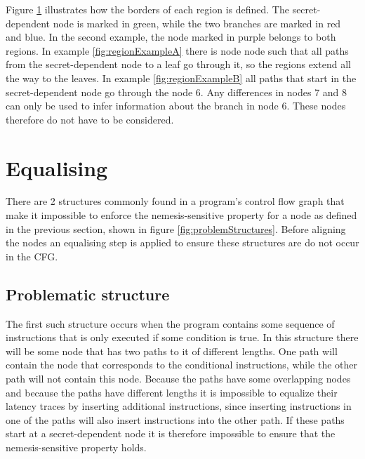 Figure \ref{fig:regionExamples} illustrates how the borders of each region is defined. The secret-dependent node is marked in green, while the two branches are marked in red and blue. In the second example, the node marked in purple belongs to both regions. In example \ref{fig:regionExampleA} there is node node such that all paths from the secret-dependent node to a leaf go through it, so the regions extend all the way to the leaves. In example \ref{fig:regionExampleB} all paths that start in the secret-dependent node go through the node 6. Any differences in nodes 7 and 8 can only be used to infer information about the branch in node 6. These nodes therefore do not have to be considered.  


\begin{figure}
 \centering

 \label{fig:regionExamples}
\end{figure}

\section{Equalising}\label{seq:equalising}
There are 2 structures commonly found in a program's control flow graph that make it impossible to enforce the nemesis-sensitive property for a node as defined in the previous section, 
shown in figure \ref{fig:problemStructures}.  Before aligning the nodes an equalising step is applied to ensure these structures are do not occur in the CFG. 

\subsection{Problematic structure}
The first such structure occurs when the program contains some sequence of instructions that is only executed if some condition is true.
In this structure there will be some node that has two paths to it of different lengths. One path will contain the node that corresponds to the conditional instructions, while the other path will 
not contain this node. Because the paths have some overlapping nodes and because the paths have different lengths it is impossible to equalize their latency traces by inserting additional instructions, since inserting instructions in one of the paths will also insert instructions into the other path. If these paths start at a secret-dependent node it is therefore impossible to 
ensure that the nemesis-sensitive property holds. 

